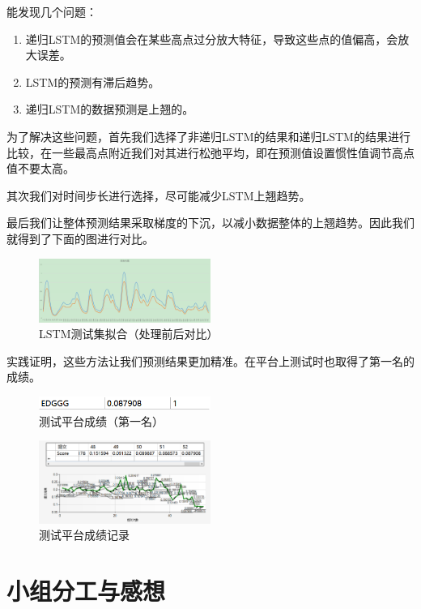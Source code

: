 \documentclass[11pt,a4paper]{elegantpaper}
\begin{document}
\begin{multicols}{2}
能发现几个问题：

\begin{enumerate}
  \item 递归LSTM的预测值会在某些高点过分放大特征，导致这些点的值偏高，会放大误差。
  \item LSTM的预测有滞后趋势。
  \item 递归LSTM的数据预测是上翘的。
\end{enumerate}

为了解决这些问题，首先我们选择了非递归LSTM的结果和递归LSTM的结果进行比较，在一些最高点附近我们对其进行松弛平均，即在预测值设置惯性值调节高点值不要太高。

其次我们对时间步长进行选择，尽可能减少LSTM上翘趋势。

最后我们让整体预测结果采取梯度的下沉，以减小数据整体的上翘趋势。因此我们就得到了下面的图进行对比。


\begin{figure}[H]
  \centering
  \includegraphics[width=0.5\textwidth]{images/FGNNNN.png}
  \caption{LSTM测试集拟合（处理前后对比）} 
\end{figure}

实践证明，这些方法让我们预测结果更加精准。在平台上测试时也取得了第一名的成绩。

\begin{figure}[H]
  \centering
  \includegraphics[width=0.5\textwidth]{images/SSSS.png}
  \caption{测试平台成绩（第一名）} 
\end{figure}


\begin{figure}[H]
  \centering
  \includegraphics[width=0.5\textwidth]{images/SSSSS.png}
  \caption{测试平台成绩记录} 
\end{figure}

\section{小组分工与感想}


\end{multicols}
\end{document}
